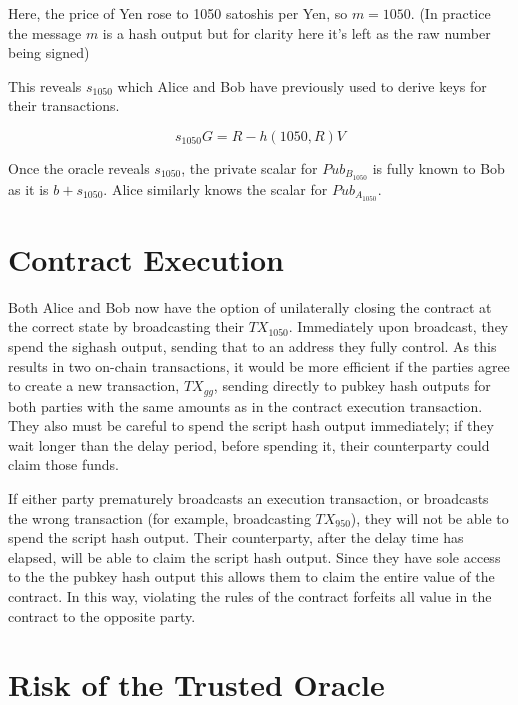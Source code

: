 \documentclass[11pt]{article}
\begin{document}
Here, the price of Yen rose to 1050 satoshis per Yen, so \(m = 1050\).  (In practice the message \(m\) is a hash output but for clarity here it's left as the raw number being signed)


This reveals \(s_{1050}\) which Alice and Bob have previously used to derive keys for their transactions.

\[s_{1050}G = R - h(1050, R)V\]

Once the oracle reveals \(s_{1050}\), the private scalar for \(Pub_{B_{1050}}\) is fully known to Bob as it is \(b + s_{1050}\).  Alice similarly knows the scalar for \(Pub_{A_{1050}}\). 

\section*{Contract Execution}

Both Alice and Bob now have the option of unilaterally closing the contract at the correct state by broadcasting their \(TX_{1050}\).  Immediately upon broadcast, they spend the sighash output, sending that to an address they fully control.  As this results in two on-chain transactions, it would be more efficient if the parties agree to create a new transaction, \(TX_{gg}\), sending directly to pubkey hash outputs for both parties with the same amounts as in the contract execution transaction.  They also must be careful to spend the script hash output immediately; if they wait longer than the delay period, before spending it, their counterparty could claim those funds.

If either party prematurely broadcasts an execution transaction, or broadcasts the wrong transaction (for example, broadcasting \(TX_{950}\)), they will not be able to spend the script hash output.  Their counterparty, after the delay time has elapsed, will be able to claim the script hash output.  Since they have sole access to the the pubkey hash output this allows them to claim the entire value of the contract.  In this way, violating the rules of the contract forfeits all value in the contract to the opposite party.

\section*{Risk of the Trusted Oracle}
\end{document}
